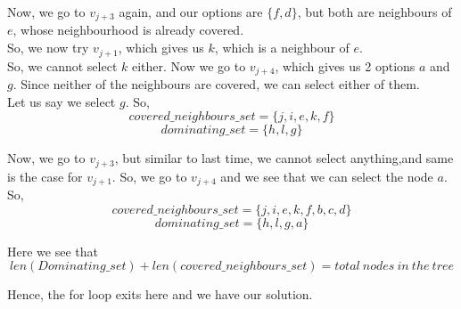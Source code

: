 \documentclass[letterpaper, 11pt]{article}
\begin{document}
Now, we go to $v_{j+3}$ again, and our options are $\{f,d\}$, but both are neighbours of $e$, whose neighbourhood is already covered.\\
So, we now try $v_{j+1}$, which gives us $k$, which is a neighbour of $e$.\\
So, we cannot select $k$ either. Now we go to $v_{j+4}$, which gives us 2 options $a$ and $g$.
Since neither of the neighbours are covered, we can select either of them. \\
Let us say we select $g$.
So,
\begin{equation*}
    covered\_neighbours\_set  = \{ j,i,e,k,f \} 
\end{equation*}
\begin{equation*}
    dominating\_set = \{ h,l,g \}
\end{equation*}

Now, we go to $v_{j+3}$, but similar to last time, we cannot select anything,and same is the case for $v_{j+1}$. 
So, we go to $v_{j+4}$ and we see that we can select the node $a$. So,
\begin{equation*}
    covered\_neighbours\_set  = \{ j,i,e,k,f,b,c,d \} 
\end{equation*}
\begin{equation*}
    dominating\_set = \{ h,l,g,a \}
\end{equation*}

Here we see that 
\begin{equation*}
    len(Dominating\_set) + len(covered\_neighbours\_set) = total\ nodes\ in\ the\ tree
\end{equation*}
                             
 Hence, the for loop exits here and we have our solution.
\end{document}
